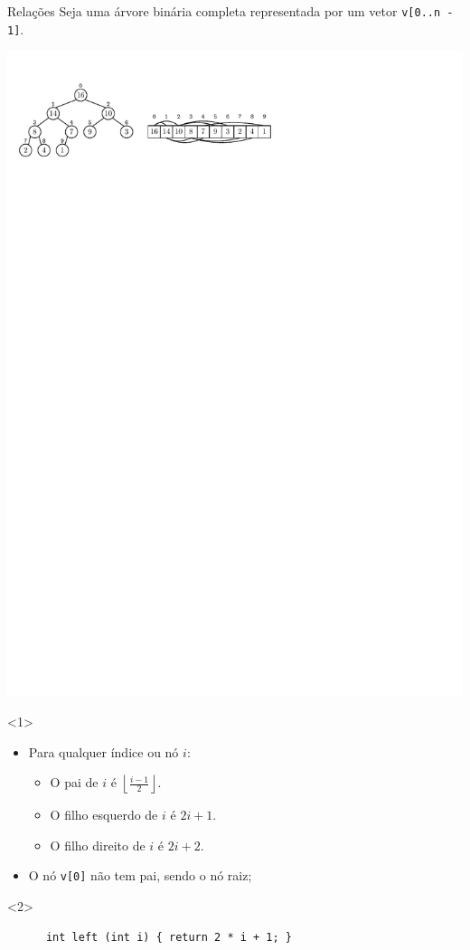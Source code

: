 \documentclass[t, 10pt]{beamer}
\begin{document}
  \begin{frame}[fragile]{Relações}
    Seja uma árvore binária completa representada por um 
    vetor \texttt{v[0..n - 1]}.
    \begin{center}
      \includegraphics[width=\textwidth]{img/img1.pdf}
    \end{center}
    \begin{onlyenv}<1>
      \begin{itemize}
        \item Para qualquer índice ou nó $i$:
        \begin{itemize}
            \item O pai de $i$ é $\left\lfloor\frac{i - 1}{2}\right\rfloor$.
            \item O filho esquerdo de $i$ é $2i + 1$.
            \item O filho direito de $i$ é $2i + 2$.
        \end{itemize}
        \item O nó \texttt{v[0]} não tem pai, sendo o nó raiz;
      \end{itemize}
    \end{onlyenv}
    \begin{onlyenv}<2>
      \vspace{-1em}
      \begin{center}
      \begin{minipage}{0.6\textwidth}
      \begin{verbatim}
      int left (int i) { return 2 * i + 1; }
      

\end{verbatim}
\end{minipage}
\end{center}
\end{onlyenv}
\end{frame}
\end{document}
